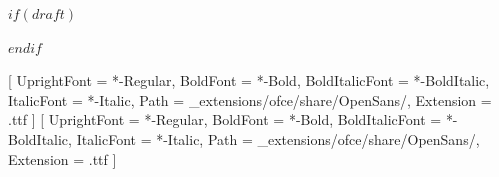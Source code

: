 \usepackage{titlepic}
\usepackage{titling}
\usepackage{graphicx}
\usepackage{fontspec}
\usepackage{placeins}
\usepackage{graphbox}
\usepackage{tikz}
\usepackage{geometry}
\usepackage{xcolor}
\usepackage{amsmath}
\usepackage[some]{background}
$if(draft)$
\usepackage[stamp,color=red!10]{draftwatermark}
$endif$
\usepackage{lipsum}
\usepackage{caption}
\usepackage{datetime}
\usepackage{xstring}
\usepackage{blindtext}
\usepackage{scrlayer-scrpage}

\setmainfont{OpenSans}[
  UprightFont = {*-Regular},
  BoldFont = {*-Bold},
  BoldItalicFont = {*-BoldItalic},
  ItalicFont = {*-Italic},
  Path = {_extensions/ofce/share/OpenSans/},
  Extension = {.ttf}
]
\setsansfont{OpenSans}[
  UprightFont = {*-Regular},
  BoldFont = {*-Bold},
  BoldItalicFont = {*-BoldItalic},
  ItalicFont = {*-Italic},
  Path = {_extensions/ofce/share/OpenSans/},
  Extension = {.ttf}
]

\def\getYear#1{\StrLeft{#1}{4}}
\def\getMonth#1{\StrMid{#1}{6}{7}}
\def\getDay#1{\StrRight{#1}{2}}

\def\jolimois#1{\monthname{\getMonth{#1}}}


\clearpairofpagestyles


\pagestyle{scrheadings}

\lofoot*{\thepage}
